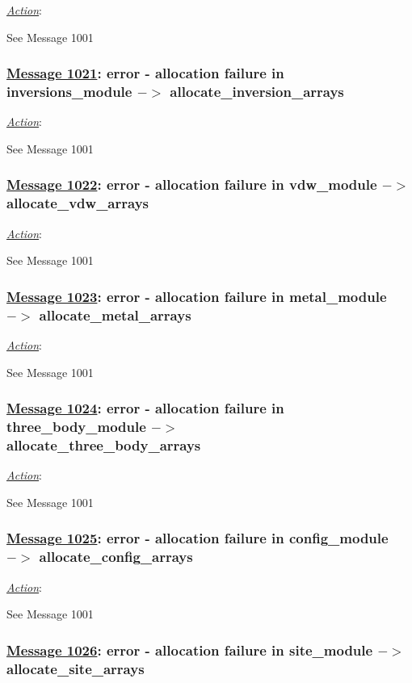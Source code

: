 \noindent \underline{\em Action}:

See Message 1001

\subsubsection*{\underline{Message 1021}: error - allocation failure in inversions\_module $->$ allocate\_inversion\_arrays}

\noindent \underline{\em Action}:

See Message 1001

\subsubsection*{\underline{Message 1022}: error - allocation failure in vdw\_module $->$ allocate\_vdw\_arrays}

\noindent \underline{\em Action}:

See Message 1001

\subsubsection*{\underline{Message 1023}: error - allocation failure in metal\_module $->$ allocate\_metal\_arrays}

\noindent \underline{\em Action}:

See Message 1001

\subsubsection*{\underline{Message 1024}: error - allocation failure in three\_body\_module $->$ \\
\noindent allocate\_three\_body\_arrays}

\noindent \underline{\em Action}:

See Message 1001

\subsubsection*{\underline{Message 1025}: error - allocation failure in config\_module $->$ allocate\_config\_arrays}

\noindent \underline{\em Action}:

See Message 1001

\subsubsection*{\underline{Message 1026}: error - allocation failure in site\_module $->$ allocate\_site\_arrays}

